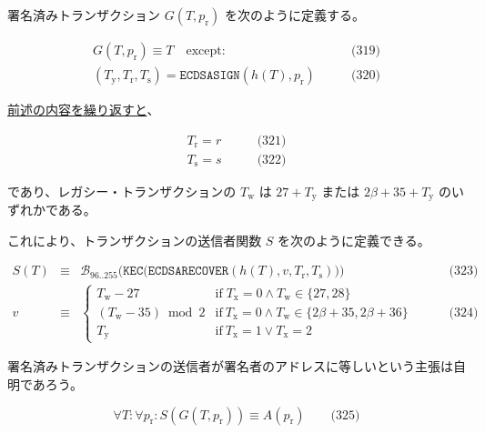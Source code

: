 \documentclass[
]{ltjsarticle}
\begin{document}
署名済みトランザクション \(G(T, p_{\mathrm{r}})\) を次のように定義する。

\protect\hypertarget{eq-319}{}{}\protect\hypertarget{eq-320}{}{}

\[\begin{aligned}
G(T, p_{\mathrm{r}}) \equiv T \quad \text{except:} & \qquad \text{(319)} \\
(T_{\mathrm{y}}, T_{\mathrm{r}}, T_{\mathrm{s}}) = \mathtt{ECDSASIGN}(h(T), p_{\mathrm{r}}) & \qquad \text{(320)}
\end{aligned}\]

\protect\hyperlink{T__r_T__s}{前述の内容を繰り返すと}、

\protect\hypertarget{eq-321}{}{}\protect\hypertarget{eq-322}{}{}

\[\begin{aligned}
{T_{\mathrm{r}}} = r & \qquad \text{(321)} \\
{T_{\mathrm{s}}} = s & \qquad \text{(322)}
\end{aligned}\]

であり、レガシー・トランザクションの \(T_{\mathrm{w}}\) は
\(27 + T_{\mathrm{y}}\) または \(2\beta + 35 + T_{\mathrm{y}}\)
のいずれかである。

これにより、トランザクションの送信者関数 \(S\) を次のように定義できる。

\protect\hypertarget{eq-323}{}{}\protect\hypertarget{eq-324}{}{}

\[\begin{aligned}
S(T) &\equiv& \mathcal{B}_{96..255}\big(\mathtt{KEC}\big( \mathtt{ECDSARECOVER}(h(T), v, T_{\mathrm{r}}, T_{\mathrm{s}}) \big) \big) & \qquad \text{(323)} \\
v &\equiv& \begin{cases}
T_{\mathrm{w}} - 27 & \text{if} \; T_{\mathrm{x}} = 0 \land T_{\mathrm{w}} \in \{27, 28\} \\
(T_{\mathrm{w}}-35) \bmod 2 & \text{if} \ T_{\mathrm{x}} = 0 \land T_{\mathrm{w}} \in \{2\beta + 35, 2\beta + 36\} \\
T_{\mathrm{y}} & \text{if} \ T_{\mathrm{x}} = 1 \lor T_{\mathrm{x}} = 2
\end{cases} & \qquad \text{(324)}
\end{aligned}\]

署名済みトランザクションの送信者が署名者のアドレスに等しいという主張は自明であろう。

\protect\hypertarget{eq-325}{}{}

\[\forall T: \forall p_{\mathrm{r}}: S(G(T, p_{\mathrm{r}})) \equiv A(p_{\mathrm{r}}) \qquad \text{(325)}\]
\end{document}
